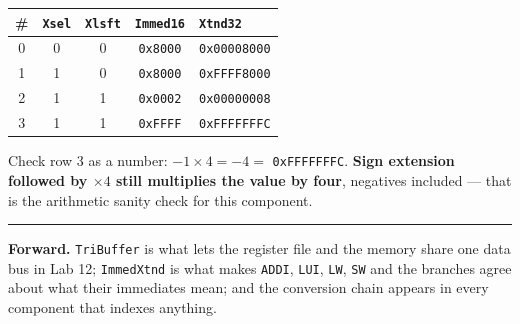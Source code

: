 \documentclass[11pt]{article}
\newcommand{\code}[1]{\texttt{#1}}
\newcommand{\hr}{\vspace{2pt}\hrule\vspace{6pt}}
\begin{document}
\begin{center}
\begin{tabular}{c|ccc|l}
\toprule
\# & \code{Xsel} & \code{Xlsft} & \code{Immed16} & \code{Xtnd32} \\
\midrule
0 & 0 & 0 & \code{0x8000} & \code{0x00008000} \\
1 & 1 & 0 & \code{0x8000} & \code{0xFFFF8000} \\
2 & 1 & 1 & \code{0x0002} & \code{0x00000008} \\
3 & 1 & 1 & \code{0xFFFF} & \code{0xFFFFFFFC} \\
\bottomrule
\end{tabular}
\end{center}

Check row 3 as a number: $-1 \times 4 = -4 =$ \code{0xFFFFFFFC}. \textbf{Sign
extension followed by $\times 4$ still multiplies the value by four}, negatives
included --- that is the arithmetic sanity check for this component.

\vspace{6pt}
\hr
{\small \textbf{Forward.} \code{TriBuffer} is what lets the register file and the
memory share one data bus in Lab 12; \code{ImmedXtnd} is what makes \code{ADDI},
\code{LUI}, \code{LW}, \code{SW} and the branches agree about what their
immediates mean; and the conversion chain appears in every component that indexes
anything.}
\end{document}
